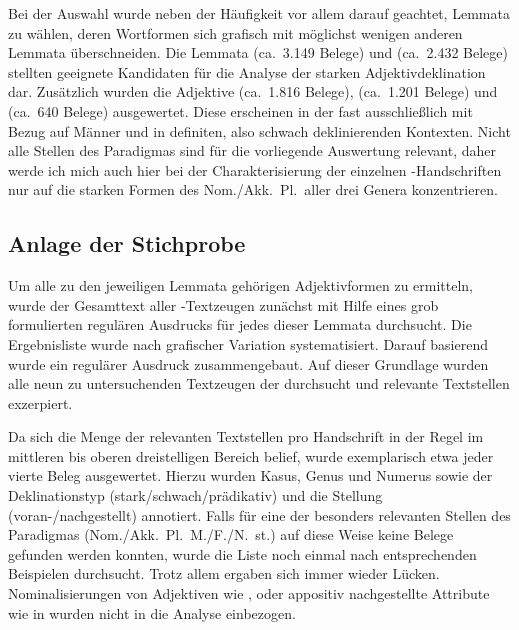 Bei der Auswahl wurde neben der Häufigkeit vor allem darauf geachtet, Lemmata
zu wählen, deren Wortformen sich grafisch mit möglichst wenigen anderen
Lemmata überschneiden. Die Lemmata
 (ca.~3.149 Belege) und
  (ca.~2.432 Belege) stellten geeignete Kandidaten für
die Analyse der starken Adjektivdeklination dar. Zusätzlich wurden die
Adjektive
  (ca.~1.816 Belege),  
(ca.~1.201 Belege) und   (ca.~640 Belege) ausgewertet.
Diese erscheinen in der \KC{} fast ausschließlich mit Bezug auf Männer und
in definiten, also schwach deklinierenden Kontexten. Nicht alle Stellen des
Paradigmas sind für die vorliegende Auswertung relevant, daher werde ich mich
auch hier bei der Charakterisierung der einzelnen \KC{}-Handschriften nur
auf die starken Formen des Nom./Akk.\ Pl.\ aller drei Genera konzentrieren.

\subsection{Anlage der Stichprobe}

Um alle zu den jeweiligen Lemmata gehörigen Adjektivformen zu ermitteln, wurde
der Gesamttext aller \KC{}-Textzeugen zunächst mit Hilfe eines grob
formulierten regulären Ausdrucks für jedes dieser Lemmata durchsucht.
Die Ergebnisliste wurde nach grafischer Variation systematisiert. Darauf
basierend wurde ein regulärer Ausdruck zusammengebaut.
Auf dieser Grundlage wurden alle neun zu untersuchenden Textzeugen der
\KC{} durchsucht und relevante Textstellen exzerpiert.

Da sich die Menge der relevanten Textstellen pro Handschrift in der Regel im
mittleren bis oberen dreistelligen Bereich belief, wurde exemplarisch etwa
jeder vierte Beleg ausgewertet. Hierzu wurden
Kasus, Genus und Numerus
sowie der Deklinationstyp (stark/schwach/prädikativ) und die Stellung
(voran-/nachgestellt) annotiert. Falls für eine der besonders relevanten
Stellen des Paradigmas (Nom./Akk.\ Pl.\ M./F./N.\ st.) auf diese Weise keine
Belege gefunden werden konnten, wurde die Liste noch einmal nach entsprechenden
Beispielen durchsucht. Trotz allem ergaben sich immer wieder Lücken.
Nominalisierungen von Adjektiven wie  ,
 oder appositiv nachgestellte Attribute wie in
  wurden nicht in die
Analyse einbezogen.

